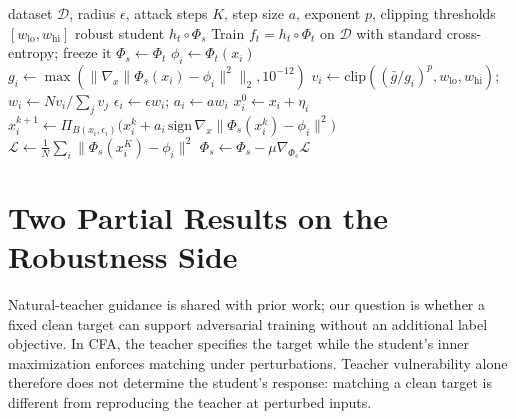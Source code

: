 \documentclass{article} %
\theoremstyle{plain}
\begin{document}
\begin{algorithm}[h]
\caption{Clean Feature Anchoring (CFA)}
\label{alg:cfa}
\begin{algorithmic}[1]
 dataset $\mathcal{D}$, radius $\epsilon$, attack steps $K$, step size $a$,
  exponent $p$, clipping thresholds $[w_{\mathrm{lo}}, w_{\mathrm{hi}}]$
 robust student $h_t \circ \Phi_s$
\STATE
\STATE {}
\STATE Train $f_t = h_t \circ \Phi_t$ on $\mathcal{D}$ with standard cross-entropy; freeze it
\STATE
\STATE {}
\STATE $\Phi_s \leftarrow \Phi_t$ \hfill {}
    \STATE $\phi_i \leftarrow \Phi_t(x_i)$ \hfill {}
    \STATE $g_i \leftarrow \max(\lVert \nabla_x \lVert \Phi_s(x_i) - \phi_i \rVert^2 \rVert_2,10^{-12})$
      \hfill {}
    \STATE $v_i \leftarrow \mathrm{clip}((\bar g/g_i)^p,w_{\mathrm{lo}},w_{\mathrm{hi}})$;
      $w_i \leftarrow Nv_i/\sum_jv_j$
    \STATE $\epsilon_i \leftarrow \epsilon w_i$; $a_i\leftarrow a w_i$
      \hfill {}
    \STATE $x_i^{0} \leftarrow x_i + \eta_i$
      \STATE $x_i^{k+1} \leftarrow \Pi_{B(x_i, \epsilon_i)}
        \big( x_i^{k} + a_i\,\mathrm{sign}\,\nabla_x \lVert \Phi_s(x_i^{k}) - \phi_i \rVert^2 \big)$
    \ENDFOR
    \STATE $\mathcal{L} \leftarrow \frac{1}{N} \sum_i
      \lVert \Phi_s(x_i^{K}) - \phi_i \rVert^2$
    \STATE $\Phi_s \leftarrow \Phi_s - \mu \nabla_{\Phi_s} \mathcal{L}$
      \hfill {}
  \ENDFOR
\ENDFOR
\end{algorithmic}
\end{algorithm}

\section{Two Partial Results on the Robustness Side}
\label{app:robustness}

Natural-teacher guidance is shared with prior work; our question is whether a fixed clean target can
support adversarial training without an additional label objective. In CFA, the teacher specifies the
target while the student's inner maximization enforces matching under perturbations. Teacher
vulnerability alone therefore does not determine the student's response: matching a clean target
is different from reproducing the teacher at perturbed inputs.
\end{document}
